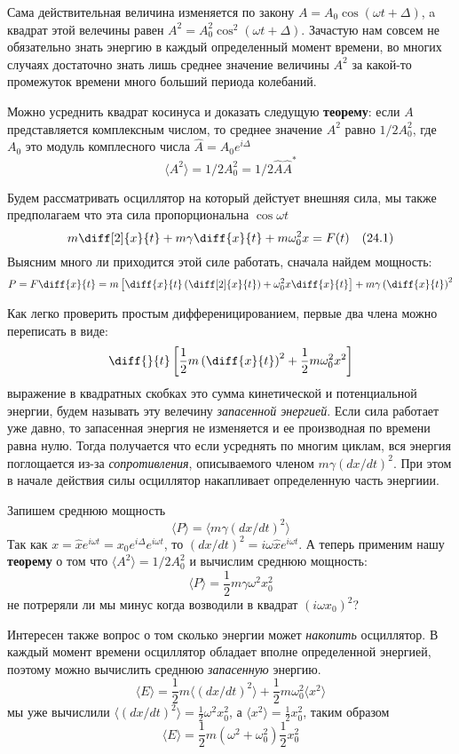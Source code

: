 \documentclass[12pt]{article}
\begin{document}
Сама действительная величина изменяется по закону \(A=A_0 \cos(\omega t + \Delta)\), a квадрат этой велечины равен \(A^2=A_0^2 \cos^2(\omega t + \Delta)\). Зачастую нам совсем не обязательно знать энергию в каждый определенный момент времени, во многих случаях достаточно знать лишь среднее значение величины \(A^2\) за какой-то промежуток времени много больший периода колебаний.

Можно усреднить квадрат косинуса и доказать следущую \textbf{теорему}: если \(A\) представляется комплексным числом, то среднее значение \(A^2\) равно \(1/2A_0^2\), где \(A_0\) это модуль комплесного числа \(\hat{A}=A_0e^{i \Delta}\)
\[
    \langle A^2 \rangle = 1/2A_0^2 = 1/2 \hat{A} \hat{A}^*    
\]

\medskip

Будем рассматривать осциллятор на который дейстует внешняя сила, мы также предполагаем что эта сила пропорциональна \(\cos \omega t\)
\[
    m \diff[2]{x}{t} + m \gamma \diff{x}{t} + m \omega_0^2 x = F(t) \quad (24.1)
\]
Выясним много ли приходится этой силе работать, сначала найдем мощность:
\[
    P = F \diff{x}{t} =
    m\left[\diff{x}{t} \left(\diff[2]{x}{t}\right) + \omega_0^2 x \diff{x}{t}\right] +
    m \gamma \left(\diff{x}{t}\right)^2
\]

Как легко проверить простым дифференицированием, первые два члена можно переписать в виде:
\[
    \diff{}{t} \left[ 
        \frac{1}{2} m \left(\diff{x}{t}\right)^2 + \frac{1}{2} m \omega_0^2 x^2
    \right]
\]
выражение в квадратных скобках это сумма кинетической и потенциальной энергии, будем называть эту велечину \textit{запасенной энергией}. Если сила работает уже давно, то запасенная энергия не изменяется и ее производная по времени равна нулю. Тогда получается что если усреднять по многим циклам, вся энергия поглощается из-за \textit{сопротивления}, описываемого членом \(m \gamma (dx/dt)^2\). При этом в начале действия силы осциллятор накапливает определенную часть энергиии.

Запишем среднюю мощность
\[
    \langle P \rangle = \langle m \gamma (dx/dt)^2 \rangle
\]
Так как \(x= \hat{x} e^{i \omega t} = x_0 e^{i \Delta} e^{i \omega t}\), то \((dx/dt)^2 = i \omega \hat{x}e^{i \omega t}\). А теперь применим нашу \textbf{теорему} о том что \(\langle A^2 \rangle = 1/2A_0^2\) и вычислим среднюю мощность:
\[
    \langle P \rangle = \frac{1}{2} m \gamma \omega^2 x_0^2
\]
не потреряли ли мы минус когда возводили в квадрат \((i \omega x_0)^2\)?

\medskip

Интересен также вопрос о том сколько энергии может \textit{накопить} осциллятор. В каждый момент времени осциллятор обладает вполне определенной энергией, поэтому можно вычислить среднюю \textit{запасенную} энергию.
\[
    \langle E \rangle = \frac{1}{2} m \langle (dx/dt)^2 \rangle  + \frac{1}{2} m \omega_0^2 \langle x^2 \rangle
\]
мы уже вычислили \( \langle (dx/dt)^2 \rangle = \frac{1}{2} \omega^2 x_0^2 \), а \(\langle x^2 \rangle = \frac{1}{2} x_0^2\), таким образом
\[
    \langle E \rangle = \frac{1}{2} m (\omega^2 + \omega_0^2) \frac{1}{2} x_0^2
\]
\end{document}
